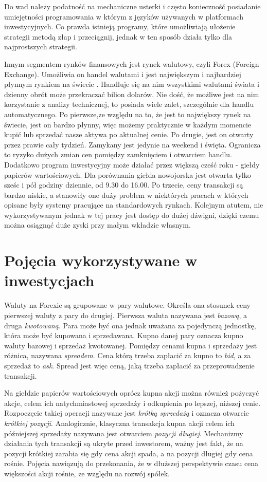 \documentclass[twoside]{iisthesis}
\begin{document}
Do wad należy podatność na mechaniczne usterki i często konieczność posiadanie umiejętności programowania w którym z języków używanych w platformach inwestycyjnych. Co prawda istnieją programy, które umożliwiają ułożenie strategii metodą złap i przeciągnij, jednak w ten sposób działa tylko dla najprostszych strategii. 

Innym segmentem rynków finansowych jest rynek walutowy, czyli Forex (Foreign Exchange). Umożliwia on handel walutami i jest największym i najbardziej płynnym rynkiem na świecie \cite{forexInvestopedia}. Handluje się na nim wszystkimi walutami świata i dzienny obrót może przekraczać bilion dolarów. Nie dość, że możliwe jest na nim korzystanie z analizy technicznej, to posiada wiele zalet, szczególnie dla handlu automatycznego. Po pierwsze,ze względu na to, że jest to największy rynek na świecie, jest on bardzo płynny, więc możemy praktycznie w każdym momencie kupić lub sprzedać nasze aktywa po aktualnej cenie. Po drugie, jest on otwarty przez prawie cały tydzień. Zamykany jest jedynie na weekend i święta. Ogranicza to ryzyko dużych zmian cen pomiędzy zamknięciem i otwarciem handlu. Dodatkowo program inwestycyjny może działać przez większą cześć roku - giełdy papierów wartościowych. Dla porównania giełda nowojorska jest otwarta tylko sześc i pół godziny dziennie, od 9.30 do 16.00. Po trzecie, ceny transakcji są bardzo niskie, a stanowiły one duży problem w niektórych pracach w których opisane były systemy pracujące na standardowych rynkach. Kolejnym atutem, nie wykorzystywanym jednak w tej pracy jest dostęp do dużej dźwigni, dzięki czemu można osiągnąć duże zyski przy małym wkładzie własnym.

\section{Pojęcia wykorzystywane w inwestycjach}

Waluty na Forexie są grupowane w pary walutowe. Określa ona stosunek ceny pierwszej waluty z pary do drugiej. Pierwsza waluta nazywana jest \textit{bazową}, a druga \textit{kwotowaną}. Para może być ona jednak uważana za pojedynczą jednostkę, która może być kupowana i sprzedawana. Kupno danej pary oznacza kupno waluty bazowej i sprzedaż kwotowanej. Pomiędzy cenami kupna i sprzedaży jest różnica, nazywana \textit{spreadem}. Cena którą trzeba zapłacić za kupno to \textit{bid}, a za sprzedaż to \textit{ask}. Spread jest więc ceną, jaką trzeba zapłacić za przeprowadzenie transakcji.

Na giełdzie papierów wartościowych oprócz kupna akcji można również pożyczyć akcje, celem ich natychmiastowej sprzedaży i odkupienia po lepszej, niższej cenie. Rozpoczęcie takiej operacji nazywane jest \textit{krótką sprzedażą} i oznacza otwarcie \textit{krótkiej pozycji}. Analogicznie, klasyczna transakcja kupna akcji celem ich późniejszej sprzedaży nazywana jest otwarciem \textit{pozycji długiej}. Mechanizmy działania tych transakcji są ukryte przed inwestorem, ważny jest fakt, że na pozycji krótkiej zarabia się gdy cena akcji spada, a na pozycji długiej gdy cena rośnie. Pojęcia nawiązują do przekonania, że w dłuższej perspektywie czasu cena większości akcji rośnie, ze względu na rozwój spółek. 
\end{document}
